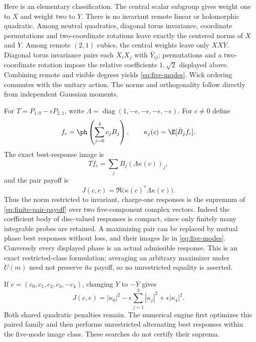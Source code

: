 Here is an elementary classification. The central scalar subgroup gives weight
one to $X$ and weight two to $Y$. There is no invariant remote linear or
holomorphic quadratic. Among neutral quadratics, diagonal torus invariance,
coordinate permutations and two-coordinate rotations leave exactly the centered
norms of $X$ and $Y$. Among remote $(2,1)$ cubics, the central weights leave only
$XX\bar Y$. Diagonal torus invariance pairs each $X_iX_j$ with $\bar Y_{ij}$;
permutations and a two-coordinate rotation impose the relative coefficients
$1,\sqrt2$ displayed above. Combining remote and visible degrees yields
\eqref{eq:five-modes}. Wick ordering commutes with the unitary action.
The norms and orthogonality follow directly from independent Gaussian moments.

For $T=P_{1,0}-\epsilon P_{2,1}$, write
$\Lambda=\operatorname{diag}(1,-\epsilon,-\epsilon,-\epsilon,-\epsilon)$.
For $c\ne0$ define
\[
 f_c=\ph\left(\sum_{j=0}^4c_jB_j\right),\qquad
 \kappa_j(c)=\E[\bar B_j f_c].
\]
The exact best-response image is
\[
 Tf_c=\sum_jB_j(\Lambda\kappa(c))_j,
\]
and the pair payoff is
\begin{equation}\label{eq:finite-pair-payoff}
 J(c,e)=\Re\bigl(\kappa(c)^*\Lambda\kappa(e)\bigr).
\end{equation}
Thus the norm restricted to invariant, charge-one responses is the supremum
of \eqref{eq:finite-pair-payoff} over two five-component complex vectors.
Indeed the coefficient body of disc-valued responses is compact, since only
finitely many integrable probes are retained. A maximizing pair can be replaced
by mutual phase best responses without loss, and their images lie in
\eqref{eq:five-modes}. Conversely every displayed phase is an actual admissible
response. This is an exact restricted-class formulation; averaging an arbitrary
maximizer under $U(m)$ need not preserve its payoff, so no unrestricted equality
is asserted.

If $e=(c_0,c_1,c_2,c_3,-c_4)$, changing $Y$ to $-Y$ gives
\[
 J(c,e)=|\kappa_0|^2-\epsilon\sum_{j=1}^3|\kappa_j|^2
                    +\epsilon|\kappa_4|^2.
\]
Both shared quadratic penalties remain. The numerical engine first optimizes
this paired family and then performs unrestricted alternating best responses
within the five-mode image class. These searches do not certify their suprema.

